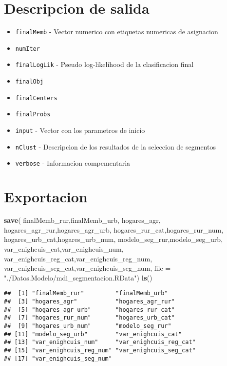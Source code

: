 \documentclass[11pt,]{article}
\newenvironment{Shaded}{\begin{snugshade}}{\end{snugshade}}
\newcommand{\KeywordTok}[1]{\textcolor[rgb]{0.13,0.29,0.53}{\textbf{#1}}}
\newcommand{\DataTypeTok}[1]{\textcolor[rgb]{0.13,0.29,0.53}{#1}}
\newcommand{\StringTok}[1]{\textcolor[rgb]{0.31,0.60,0.02}{#1}}
\newcommand{\NormalTok}[1]{#1}
\begin{document}
\section{Descripcion de salida}\label{descripcion-de-salida}

\begin{itemize}
\item
  \texttt{finalMemb} - Vector numerico con etiquetas numericas de
  asignacion
\item
  \texttt{numIter}
\item
  \texttt{finalLogLik} - Pseudo log-likelihood de la clasificacion final
\item
  \texttt{finalObj}
\item
  \texttt{finalCenters}
\item
  \texttt{finalProbs}
\item
  \texttt{input} - Vector con los parametros de inicio
\item
  \texttt{nClust} - Descripcion de los resultados de la seleccion de
  segmentos
\item
  \texttt{verbose} - Informacion compementaria
\end{itemize}

\section{Exportacion}\label{exportacion}

\begin{Shaded}
\begin{Highlighting}[]
\KeywordTok{save}\NormalTok{( finalMemb_rur,finalMemb_urb,}
\NormalTok{      hogares_agr,}
\NormalTok{      hogares_agr_rur,hogares_agr_urb,}
\NormalTok{      hogares_rur_cat,hogares_rur_num,}
\NormalTok{      hogares_urb_cat,hogares_urb_num,}
\NormalTok{      modelo_seg_rur,modelo_seg_urb,}
\NormalTok{      var_enighcuis_cat,var_enighcuis_num,}
\NormalTok{      var_enighcuis_reg_cat,var_enighcuis_reg_num,}
\NormalTok{      var_enighcuis_seg_cat,var_enighcuis_seg_num,}
     \DataTypeTok{file =} \StringTok{"./Datos.Modelo/mdi_segmentacion.RData"}\NormalTok{)}
\KeywordTok{ls}\NormalTok{()}
\end{Highlighting}
\end{Shaded}

\begin{verbatim}
##  [1] "finalMemb_rur"         "finalMemb_urb"        
##  [3] "hogares_agr"           "hogares_agr_rur"      
##  [5] "hogares_agr_urb"       "hogares_rur_cat"      
##  [7] "hogares_rur_num"       "hogares_urb_cat"      
##  [9] "hogares_urb_num"       "modelo_seg_rur"       
## [11] "modelo_seg_urb"        "var_enighcuis_cat"    
## [13] "var_enighcuis_num"     "var_enighcuis_reg_cat"
## [15] "var_enighcuis_reg_num" "var_enighcuis_seg_cat"
## [17] "var_enighcuis_seg_num"
\end{verbatim}
\end{document}

